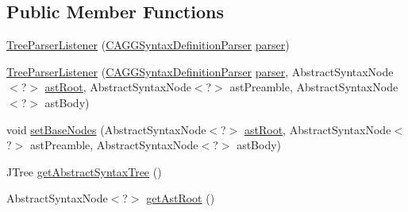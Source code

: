 \subsection*{Public Member Functions}
\begin{DoxyCompactItemize}
\item 
\hyperlink{classit_1_1emarolab_1_1cagg_1_1core_1_1language_1_1parser_1_1ANTLRInterface_1_1TreeParserListener_a6fa6c6d0ef410c647cd37a9225b99076}{Tree\-Parser\-Listener} (\hyperlink{classit_1_1emarolab_1_1cagg_1_1core_1_1language_1_1parser_1_1ANTLRInterface_1_1ANTLRGenerated_1_1CAGGSyntaxDefinitionParser}{C\-A\-G\-G\-Syntax\-Definition\-Parser} \hyperlink{classit_1_1emarolab_1_1cagg_1_1core_1_1language_1_1parser_1_1ANTLRInterface_1_1TreeParserListener_a81b2e5e2d506fb0384e95edadf4a844c}{parser})
\item 
\hyperlink{classit_1_1emarolab_1_1cagg_1_1core_1_1language_1_1parser_1_1ANTLRInterface_1_1TreeParserListener_a0a7e233d4cf8f122b8f2be7bc4e55550}{Tree\-Parser\-Listener} (\hyperlink{classit_1_1emarolab_1_1cagg_1_1core_1_1language_1_1parser_1_1ANTLRInterface_1_1ANTLRGenerated_1_1CAGGSyntaxDefinitionParser}{C\-A\-G\-G\-Syntax\-Definition\-Parser} \hyperlink{classit_1_1emarolab_1_1cagg_1_1core_1_1language_1_1parser_1_1ANTLRInterface_1_1TreeParserListener_a81b2e5e2d506fb0384e95edadf4a844c}{parser}, Abstract\-Syntax\-Node$<$?$>$ \hyperlink{classit_1_1emarolab_1_1cagg_1_1core_1_1language_1_1parser_1_1ANTLRInterface_1_1TreeParserListener_ad21c3a5295c708707d5d40758bf3cb47}{ast\-Root}, Abstract\-Syntax\-Node$<$?$>$ ast\-Preamble, Abstract\-Syntax\-Node$<$?$>$ ast\-Body)
\item 
void \hyperlink{classit_1_1emarolab_1_1cagg_1_1core_1_1language_1_1parser_1_1ANTLRInterface_1_1TreeParserListener_a895ff6396948c3c9998b2ca7dc5ab587}{set\-Base\-Nodes} (Abstract\-Syntax\-Node$<$?$>$ \hyperlink{classit_1_1emarolab_1_1cagg_1_1core_1_1language_1_1parser_1_1ANTLRInterface_1_1TreeParserListener_ad21c3a5295c708707d5d40758bf3cb47}{ast\-Root}, Abstract\-Syntax\-Node$<$?$>$ ast\-Preamble, Abstract\-Syntax\-Node$<$?$>$ ast\-Body)
\item 
J\-Tree \hyperlink{classit_1_1emarolab_1_1cagg_1_1core_1_1language_1_1parser_1_1ANTLRInterface_1_1TreeParserListener_a6da7fdbad8b11ca6277f62f5ba17cd07}{get\-Abstract\-Syntax\-Tree} ()
\item 
Abstract\-Syntax\-Node$<$?$>$ \hyperlink{classit_1_1emarolab_1_1cagg_1_1core_1_1language_1_1parser_1_1ANTLRInterface_1_1TreeParserListener_ad2b6adac06ab1314d865f223093794bf}{get\-Ast\-Root} ()
\item 

\end{DoxyCompactItemize}
